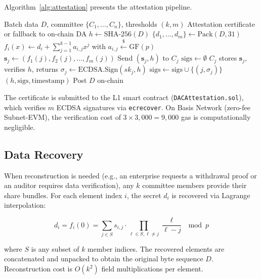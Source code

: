 Algorithm~\ref{alg:attestation} presents the attestation pipeline.

\begin{algorithm}[h]
\caption{Shamir-DAC Attestation Pipeline}
\label{alg:attestation}
\begin{algorithmic}[1]
\Require Batch data $D$, committee $\{C_1, \ldots, C_n\}$, thresholds $(k, m)$
\Ensure Attestation certificate or fallback to on-chain DA
\State $h \gets \text{SHA-256}(D)$ 
\State $\{d_1, \ldots, d_m\} \gets \text{Pack}(D, 31)$ 
  \State $f_i(x) \gets d_i + \sum_{j=1}^{k-1} a_{i,j} x^j$ with $a_{i,j} \stackrel{\$}{\leftarrow} \mathrm{GF}(p)$
\EndFor
{}
  \State $\mathbf{s}_j \gets (f_1(j), f_2(j), \ldots, f_m(j))$
  \State Send $(\mathbf{s}_j, h)$ to $C_j$
\EndFor
\State $\text{sigs} \gets \emptyset$
  \State $C_j$ stores $\mathbf{s}_j$, verifies $h$, returns $\sigma_j \gets \text{ECDSA.Sign}(sk_j, h)$
  \State $\text{sigs} \gets \text{sigs} \cup \{(j, \sigma_j)\}$
\EndFor
{}
  \State \Return {}$(h, \text{sigs}, \text{timestamp})$
\Else
  \State Post $D$ on-chain 
\EndIf
\end{algorithmic}
\end{algorithm}

The certificate is submitted to the L1 smart contract
(\texttt{DACAttestation.sol}), which verifies $m$ ECDSA signatures via
\texttt{ecrecover}. On Basis Network (zero-fee Subnet-EVM), the verification
cost of $3 \times 3{,}000 = 9{,}000$ gas is computationally negligible.

\subsection{Data Recovery}

When reconstruction is needed (e.g., an enterprise requests a withdrawal proof
or an auditor requires data verification), any $k$ committee members provide
their share bundles. For each element index $i$, the secret $d_i$ is recovered
via Lagrange interpolation:

\begin{equation}
d_i = f_i(0) = \sum_{j \in S} s_{i,j} \cdot \prod_{\ell \in S, \ell \neq j}
\frac{\ell}{\ell - j} \mod p
\label{eq:lagrange}
\end{equation}

\noindent where $S$ is any subset of $k$ member indices. The recovered
elements are concatenated and unpacked to obtain the original byte sequence
$D$. Reconstruction cost is $O(k^2)$ field multiplications per element.


